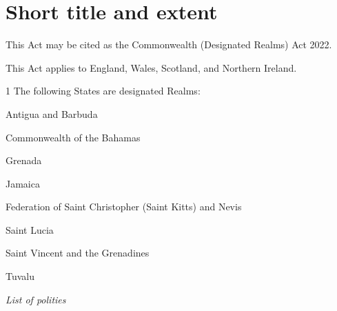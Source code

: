 \documentclass{ukbill}
\begin{document}
\section{Short title and extent}
\begin{numstat}
	\item This Act may be cited as the Commonwealth (Designated Realms) Act 2022.
	\item This Act applies to England, Wales, Scotland, and Northern Ireland.
\end{numstat}

%
%
%

\startschedule


\begin{nostat}
\item[1]   The following States are designated Realms:
\begin{numstat}
	\item Antigua and Barbuda
	\item Commonwealth of the Bahamas
	\item Grenada
	\item Jamaica
	\item Federation of Saint Christopher (Saint Kitts) and Nevis
	\item Saint Lucia
	\item Saint Vincent and the Grenadines
	\item Tuvalu
\end{numstat}

\end{nostat}



\noindent\emph{List of polities}
\end{document}
